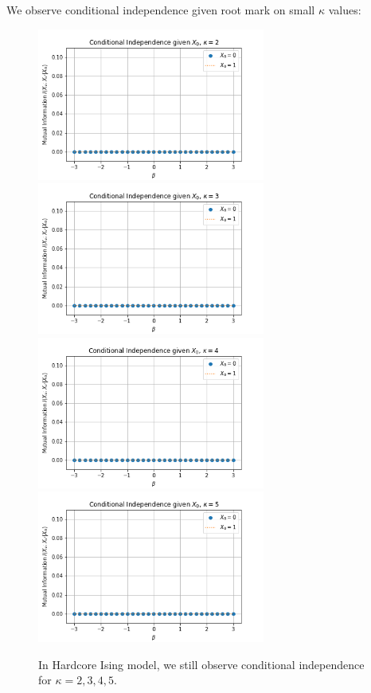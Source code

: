 \documentclass[12pt]{article}
\numberwithin{equation}{section}
\begin{document}
We observe conditional independence given root mark on small $\kappa$ values:
\begin{figure}[h]
    \centering
    \includegraphics[width=7.5cm]{img/HA_Ising/CI_kappa2.png}
    \includegraphics[width=7.5cm]{img/HA_Ising/CI_kappa3.png}
    \includegraphics[width=7.5cm]{img/HA_Ising/CI_kappa4.png}
    \includegraphics[width=7.5cm]{img/HA_Ising/CI_kappa5.png}
    \caption{In Hardcore Ising model, we still observe conditional independence for $\kappa=2, 3, 4, 5$.}
    \label{Fig.HAIS-CI}
\end{figure}
\end{document}
